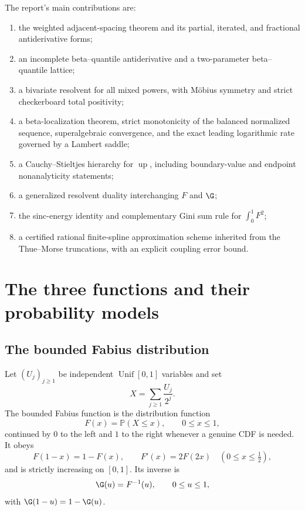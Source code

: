 \documentclass[11pt,oneside]{article}
\theoremstyle{definition}
\theoremstyle{remark}
\newcommand{\F}{F}
\newcommand{\Up}{\operatorname{up}}
\newcommand{\Pp}{\mathbb P}
\newcommand{\1}{\mathbf 1}
\begin{document}
The report's main contributions are:
\begin{enumerate}
  \item the weighted adjacent-spacing theorem and its partial, iterated, and
        fractional antiderivative forms;
  \item an incomplete beta--quantile antiderivative and a two-parameter
        beta--quantile lattice;
  \item a bivariate resolvent for all mixed powers, with Möbius symmetry and
        strict checkerboard total positivity;
  \item a beta-localization theorem, strict monotonicity of the balanced
        normalized sequence, superalgebraic convergence, and the exact leading
        logarithmic rate governed by a Lambert saddle;
  \item a Cauchy--Stieltjes hierarchy for \(\Up\), including boundary-value and
        endpoint nonanalyticity statements;
  \item a generalized resolvent duality interchanging \(\F\) and \(\G\);
  \item the sinc-energy identity and complementary Gini sum rule for
        \(\int_0^1\F^2\);
  \item a certified rational finite-spline approximation scheme inherited from
        the Thue--Morse truncations, with an explicit coupling error bound.
\end{enumerate}

\section{The three functions and their probability models}

\subsection{The bounded Fabius distribution}

Let \((U_j)_{j\ge1}\) be independent \(\operatorname{Unif}[0,1]\) variables and
set
\begin{equation}\label{p12:eq:Xdef}
  X=\sum_{j\ge1}\frac{U_j}{2^j}.
\end{equation}
The bounded Fabius function is the distribution function
\begin{equation}
  \F(x)=\Pp(X\le x),\qquad 0\le x\le1,
\end{equation}
continued by \(0\) to the left and \(1\) to the right whenever a genuine CDF is
needed.  It obeys
\begin{equation}\label{p12:eq:Fbasic}
 \F(1-x)=1-\F(x),\qquad
 \F'(x)=2\F(2x)\quad(0\le x\le\tfrac12),
\end{equation}
and is strictly increasing on \([0,1]\).  Its inverse is
\begin{equation}
  \G(u)=\F^{-1}(u),\qquad 0\le u\le1,
\end{equation}
with \(\G(1-u)=1-\G(u)\).
\end{document}
